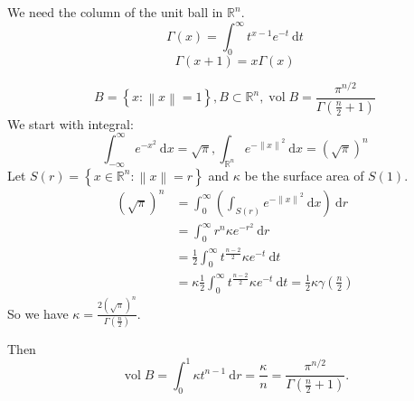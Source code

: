 \documentclass{report}
\newcommand{\R}{\mathbb{R}}
\newcommand{\vol}{\operatorname{vol}}
\newcommand{\idf}{\ \mathrm{d}}
\newcommand{\norm}[1]{\left\| #1 \right\|}
\newcommand{\set}[1]{\left\{ #1 \right\}}
\theoremstyle{definition}
\theoremstyle{remark}
\numberwithin{equation}{section}
\begin{document}
We need the column of the unit ball in $\R^n$.
\[\Gamma(x) = \int_0^\infty t^{x-1}e^{-t}\idf t\]
\[\Gamma(x+1) = x\Gamma(x)\]

\[B = \set{x: \norm{x} = 1}, B \subset \R^n, \vol B = \frac{\pi^{n/2}}{\Gamma\left(\frac{n}{2}+1\right)}\]
We start with integral:
\[\int_{-\infty}^\infty e^{-x^2}\idf x = \sqrt{\pi}, \int_{\R^n} e^{-\norm{x}^2}\idf x = \left(\sqrt{\pi}\right)^n\]
Let $S(r) = \set{x \in \R^n: \norm{x} = r}$ and $\kappa$ be the surface area of $S(1)$.
\begin{align*}
    \left(\sqrt{\pi}\right)^n & = \int_{0}^\infty \left(\int_{S(r)} e^{-\norm{x}^2} \idf x\right) \idf r \\
    & = \int_0^\infty r^n\kappa e^{-r^2}\idf r \\
    & = \frac{1}{2}\int_0^\infty t^{\frac{n-2}{2}}\kappa e^{-t}\idf t \\
    & = \kappa \frac{1}{2} \int_0^\infty t^{\frac{n-2}{2}}\kappa e^{-t}\idf t = \frac{1}{2}\kappa \gamma\left(\frac{n}{2}\right)
\end{align*}
So we have $\kappa = \frac{2\left(\sqrt{\pi}\right)^n}{\Gamma\left(\frac{n}{2}\right)}$.

Then \[
    \vol B = \int_0^1 \kappa t^{n-1} \idf r = \frac{\kappa}{n} = \frac{\pi^{n/2}}{\Gamma\left(\frac{n}{2}+1\right)}.
\]
\end{document}
